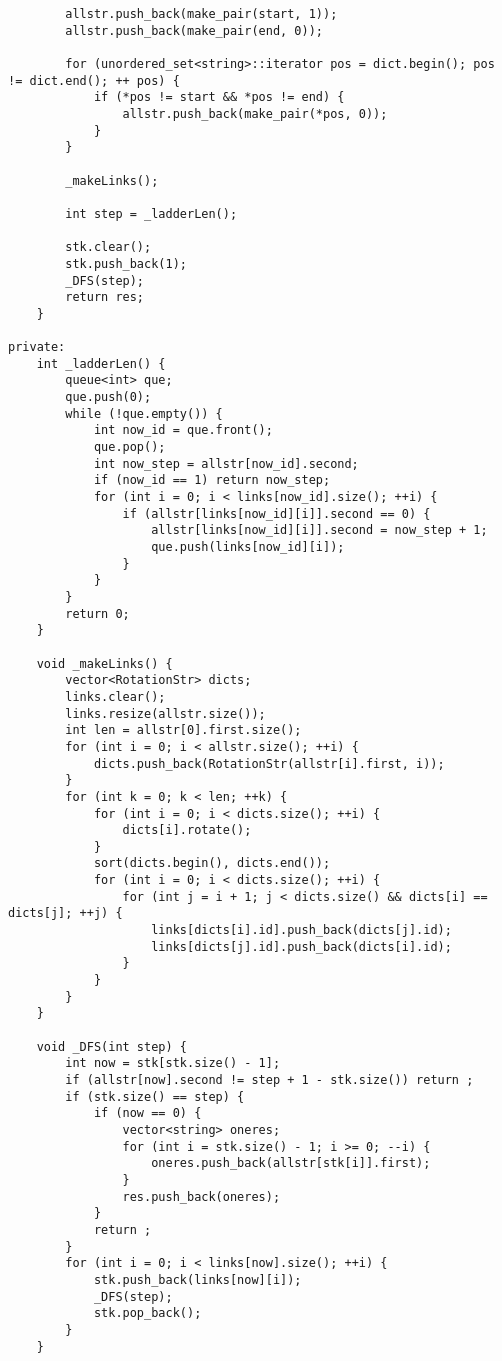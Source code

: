 \documentclass{article}
\begin{document}
\begin{CJK*}{UTF8}{gkai}
\begin{lstlisting}
        allstr.push_back(make_pair(start, 1));
        allstr.push_back(make_pair(end, 0));
        
        for (unordered_set<string>::iterator pos = dict.begin(); pos != dict.end(); ++ pos) {
            if (*pos != start && *pos != end) {
                allstr.push_back(make_pair(*pos, 0));
            }
        }
        
        _makeLinks();
        
        int step = _ladderLen();
        
        stk.clear();
        stk.push_back(1);
        _DFS(step);
        return res;
    }
    
private:
    int _ladderLen() {
        queue<int> que;
        que.push(0);
        while (!que.empty()) {
            int now_id = que.front();
            que.pop();
            int now_step = allstr[now_id].second;
            if (now_id == 1) return now_step;
            for (int i = 0; i < links[now_id].size(); ++i) {
                if (allstr[links[now_id][i]].second == 0) {
                    allstr[links[now_id][i]].second = now_step + 1;
                    que.push(links[now_id][i]);
                }
            }
        }
        return 0;
    }
    
    void _makeLinks() {
        vector<RotationStr> dicts;
        links.clear();
        links.resize(allstr.size());
        int len = allstr[0].first.size();
        for (int i = 0; i < allstr.size(); ++i) {
            dicts.push_back(RotationStr(allstr[i].first, i));
        }
        for (int k = 0; k < len; ++k) {
            for (int i = 0; i < dicts.size(); ++i) {
                dicts[i].rotate();
            }
            sort(dicts.begin(), dicts.end());
            for (int i = 0; i < dicts.size(); ++i) {
                for (int j = i + 1; j < dicts.size() && dicts[i] == dicts[j]; ++j) {
                    links[dicts[i].id].push_back(dicts[j].id);
                    links[dicts[j].id].push_back(dicts[i].id);
                }
            }
        }
    }
    
    void _DFS(int step) {
        int now = stk[stk.size() - 1];
        if (allstr[now].second != step + 1 - stk.size()) return ;
        if (stk.size() == step) {
            if (now == 0) {
                vector<string> oneres;
                for (int i = stk.size() - 1; i >= 0; --i) {
                    oneres.push_back(allstr[stk[i]].first);
                }
                res.push_back(oneres);
            }
            return ;
        }
        for (int i = 0; i < links[now].size(); ++i) {
            stk.push_back(links[now][i]);
            _DFS(step);
            stk.pop_back();
        }
    }
    

\end{lstlisting}
\end{CJK*}
\end{document}
